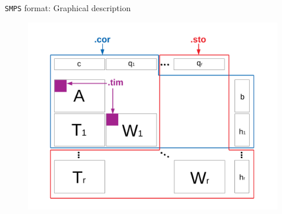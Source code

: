 \documentclass[usenames,dvipsnames]{beamer}
\newcommand{\julia}{\texttt{Julia}}
\begin{document}
\begin{frame}{\texttt{SMPS} format: Graphical description}
\vspace{-0.35cm}
\begin{figure}
\begin{center}
\includegraphics[width=\textwidth]{SMPS_description_slide}
\end{center}
\end{figure}
\end{frame}
%
\end{document}
